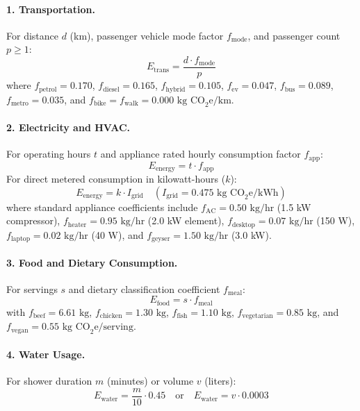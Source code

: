 \documentclass[12pt,a4paper]{article}
\begin{document}
\paragraph{1. Transportation.}
For distance $d$ (km), passenger vehicle mode factor $f_{\text{mode}}$, and passenger count $p \ge 1$:
\begin{equation}
    E_{\text{trans}} = \frac{d \cdot f_{\text{mode}}}{p}
\end{equation}
where $f_{\text{petrol}} = 0.170$, $f_{\text{diesel}} = 0.165$, $f_{\text{hybrid}} = 0.105$, $f_{\text{ev}} = 0.047$, $f_{\text{bus}} = 0.089$, $f_{\text{metro}} = 0.035$, and $f_{\text{bike}} = f_{\text{walk}} = 0.000\text{ kg CO}_2\text{e/km}$.

\paragraph{2. Electricity and HVAC.}
For operating hours $t$ and appliance rated hourly consumption factor $f_{\text{app}}$:
\begin{equation}
    E_{\text{energy}} = t \cdot f_{\text{app}}
\end{equation}
For direct metered consumption in kilowatt-hours ($k$):
\begin{equation}
    E_{\text{energy}} = k \cdot I_{\text{grid}} \quad (I_{\text{grid}} = 0.475\text{ kg CO}_2\text{e/kWh})
\end{equation}
where standard appliance coefficients include $f_{\text{AC}} = 0.50\text{ kg/hr}$ (1.5 kW compressor), $f_{\text{heater}} = 0.95\text{ kg/hr}$ (2.0 kW element), $f_{\text{desktop}} = 0.07\text{ kg/hr}$ (150 W), $f_{\text{laptop}} = 0.02\text{ kg/hr}$ (40 W), and $f_{\text{geyser}} = 1.50\text{ kg/hr}$ (3.0 kW).

\paragraph{3. Food and Dietary Consumption.}
For servings $s$ and dietary classification coefficient $f_{\text{meal}}$:
\begin{equation}
    E_{\text{food}} = s \cdot f_{\text{meal}}
\end{equation}
with $f_{\text{beef}} = 6.61\text{ kg}$, $f_{\text{chicken}} = 1.30\text{ kg}$, $f_{\text{fish}} = 1.10\text{ kg}$, $f_{\text{vegetarian}} = 0.85\text{ kg}$, and $f_{\text{vegan}} = 0.55\text{ kg CO}_2\text{e/serving}$.

\paragraph{4. Water Usage.}
For shower duration $m$ (minutes) or volume $v$ (liters):
\begin{equation}
    E_{\text{water}} = \frac{m}{10} \cdot 0.45 \quad \text{or} \quad E_{\text{water}} = v \cdot 0.0003
\end{equation}
\end{document}

